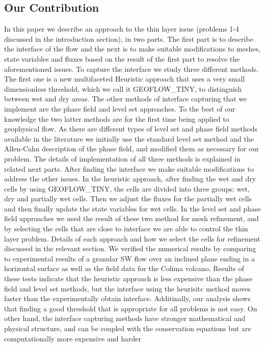 \documentclass[letterpaper,10pt]{article}
\begin{document}
\subsection{Our Contribution}
In this paper we describe an approach to the thin layer issue (problems 1-4 discussed in the introduction section), in two parts. 
The first part is to describe the interface of the 
flow and the next is to make suitable modifications to meshes, state variables and fluxes based on the result of the first part to resolve the aforementioned issues.
To capture the interface we study three different methods. The first one is a new multifaceted Heuristic approach that uses a very small dimensionless threshold, which we call it GEOFLOW\_TINY, to 
distinguish between wet and dry areas. The other methods of interface capturing that we implement are the phase field and level set approaches.
To the best of our knowledge the two latter methods are for the first time being applied to geophysical flow. 
As there are different types of level set and phase field methods available in the 
literature we initially use the standard level set method and the Allen-Cahn description of the phase field, and modified them as necessary for our problem. 
The details of implementation of all three methods is explained in related next parts.
After finding the interface we make suitable modifications to address the other issues. In the heuristic approach, after finding the wet and dry cells by using GEOFLOW\_TINY, the cells are divided 
into three groups: wet, dry and partially wet cells. Then we adjust the fluxes for the partially wet cells and then finally update the state variables for wet cells.
In the level set and phase field approaches we used the result of these two method for mesh refinement, and by selecting the cells that are close to interface we are able to control the thin layer problem. 
Details of each approach and how we select the cells for refinement discussed in the relevant section.
We verified the numerical results by comparing to experimental results of a granular SW flow over an inclined plane ending in a horizontal surface as well as the field data for the Colima volcano.
Results of these tests indicate that
the heuristic approach is less expensive than the phase field and level set methods, but the interface using the heurisitc method moves faster than the 
experimentally obtain interface. Additinally, our analysis shows that finding a good threshold that is appropriate for all problems is not easy. 
On other hand, the interface capturing methods have stronger mathematical and physical structure, and can be coupled with the conservation equations but are computationally more expensive and harder 
\end{document}
